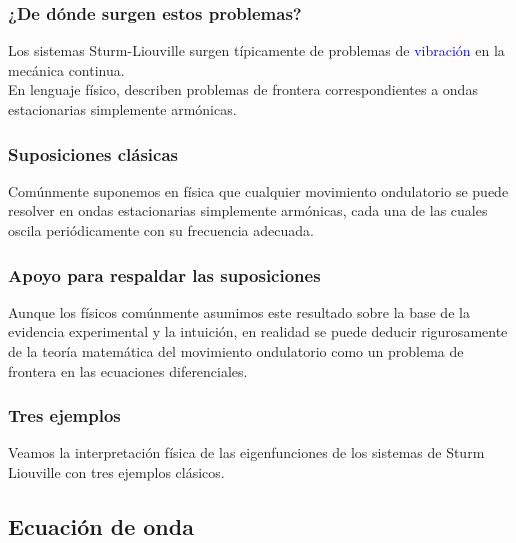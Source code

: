 \documentclass[12pt]{beamer}
\begin{document}
\begin{frame}
\frametitle{¿De dónde surgen estos problemas?}
Los sistemas Sturm-Liouville surgen típicamente de problemas de \textcolor{blue}{vibración} en la mecánica continua.
\\
\bigskip
\pause
En lenguaje físico, describen problemas de frontera correspondientes a ondas estacionarias simplemente armónicas.
\end{frame}
\begin{frame}
\frametitle{Suposiciones clásicas}
Comúnmente suponemos en física que cualquier movimiento ondulatorio se puede resolver en ondas estacionarias simplemente armónicas, cada una de las cuales oscila periódicamente con su frecuencia adecuada.
\end{frame}
\begin{frame}
\frametitle{Apoyo para respaldar las suposiciones}
Aunque los físicos comúnmente asumimos este resultado sobre la base de la evidencia experimental y la intuición, \pause en realidad se puede deducir rigurosamente de la teoría matemática del movimiento ondulatorio como un problema de frontera en las ecuaciones diferenciales.
\end{frame}
\begin{frame}
\frametitle{Tres ejemplos}
Veamos la interpretación física de las eigenfunciones de los sistemas de Sturm Liouville con tres ejemplos clásicos.
\end{frame}

\subsection{Ecuación de onda}
\end{document}
